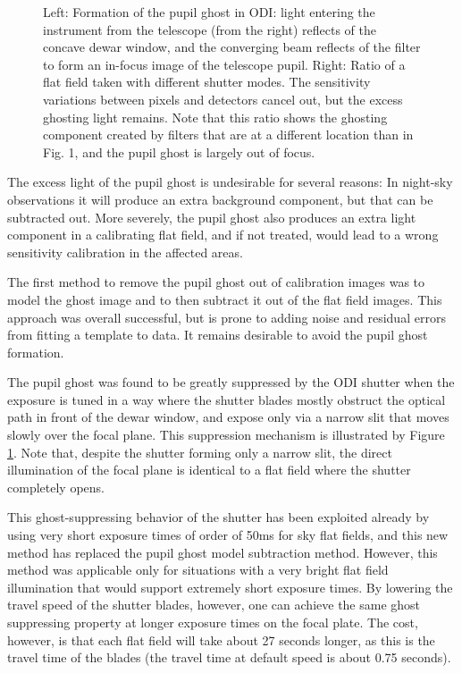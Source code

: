 \documentclass[]{spieman}
\begin{document}
\begin{figure}
	\caption{ \label{fig_pupilghost}Left: Formation of the pupil ghost in ODI:  light 
		entering the instrument from the telescope (from the right) reflects of the
		concave dewar window, and the converging beam reflects of the filter to
		form an in-focus image of the telescope pupil. Right: Ratio of a flat
		field taken with different shutter modes. The sensitivity variations between
		pixels and detectors cancel out, but the excess ghosting light remains. Note
		that this ratio shows the ghosting component created by filters that are at
		a different location than in Fig. 1, and the pupil ghost is largely out of
		focus.}
	
\end{figure}

The excess light of the pupil ghost is undesirable for several reasons: In
night-sky observations it will produce an extra background component, but that
can be subtracted out. More severely, the pupil ghost also produces an extra
light component in a calibrating flat field, and if not treated, would lead to a
wrong sensitivity calibration in the affected areas.

The first method to remove the pupil ghost out of calibration images was to
model the ghost image and to then subtract it out of the flat field images. This
approach was overall successful, but is prone to adding noise and residual
errors from fitting a template to data. It remains desirable to avoid the pupil
ghost formation.

The pupil ghost was found to be greatly suppressed by the ODI shutter when the
exposure is tuned in a way where the shutter blades mostly obstruct the optical
path in front of the dewar window, and expose only via a narrow slit that moves
slowly over the focal plane. This suppression mechanism is illustrated by Figure
\ref{fig_pupilghost}. Note that, despite the shutter forming only a narrow slit,
the direct illumination of the focal plane is identical to a flat field where
the shutter completely opens.

This ghost-suppressing behavior of the shutter has been exploited already by
using very short exposure times of order of 50ms for sky flat fields, and this
new method has replaced the pupil ghost model subtraction method. However,
 this method was applicable only for situations with a very
bright flat field illumination that would support extremely short exposure
times. By lowering the travel speed of the shutter blades, however, one can
achieve the same ghost suppressing property at longer exposure times on the
focal plate. The cost, however, is that each flat field will take about 27
seconds longer, as this is the travel time of the blades (the travel time at
default speed is about 0.75 seconds).
\end{document}
